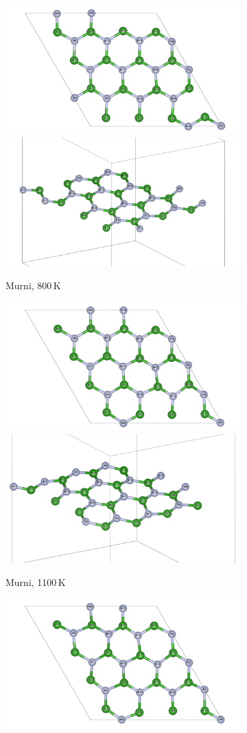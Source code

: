 \begin{figure}[htbp]
  \centering
  \begin{subfigure}{\textwidth}
    \centering
    \includegraphics[width=0.49\linewidth]{gambar_hasil/hBN_pure_800K.png}\hfill
    \includegraphics[width=0.49\linewidth]{gambar_hasil/hBN_pure_side_800K.png}
    \caption{Murni, 800 K}
    \label{subfig:md_pure_800k}
  \end{subfigure}
  \vspace{1em}
  \begin{subfigure}{\textwidth}
    \centering
    \includegraphics[width=0.49\linewidth]{gambar_hasil/hBN_pure_1100K.png}\hfill
    \includegraphics[width=0.49\linewidth]{gambar_hasil/hBN_pure_side_1100K.png}
    \caption{Murni, 1100 K}
    \label{subfig:md_pure_1100k}
  \end{subfigure}
  \vspace{1em}
  \begin{subfigure}{\textwidth}
    \centering
    \includegraphics[width=0.49\linewidth]{gambar_hasil/hBN_pure_1225K.png}\hfill

\end{subfigure}
\end{figure}
